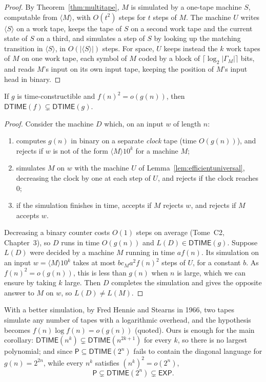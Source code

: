 \begin{proof}
By Theorem~\ref{thm:multitape}, $M$ is simulated by a one-tape machine $S$, computable from $\langle M\rangle$, with $O(t^2)$ steps for $t$ steps of $M$. The machine $U$ writes $\langle S\rangle$ on a work tape, keeps the tape of $S$ on a second work tape and the current state of $S$ on a third, and simulates a step of $S$ by looking up the matching transition in $\langle S\rangle$, in $O(|\langle S\rangle|)$ steps. For space, $U$ keeps instead the $k$ work tapes of $M$ on one work tape, each symbol of $M$ coded by a block of $\lceil\log_2|\Gamma_M|\rceil$ bits, and reads $M$'s input on its own input tape, keeping the position of $M$'s input head in binary.
\end{proof}

\begin{theorem}\label{thm:timehierarchy}
If $g$ is time-constructible and $f(n)^2=o(g(n))$, then $\mathsf{DTIME}(f)\subsetneq\mathsf{DTIME}(g)$.
\end{theorem}

\begin{proof}
Consider the machine $D$ which, on an input $w$ of length $n$:
\begin{enumerate}
\item computes $g(n)$ in binary on a separate \emph{clock} tape (time $O(g(n))$), and rejects if $w$ is not of the form $\langle M\rangle10^k$ for a machine $M$;
\item simulates $M$ on $w$ with the machine $U$ of Lemma~\ref{lem:efficientuniversal}, decreasing the clock by one at each step of $U$, and rejects if the clock reaches $0$;
\item if the simulation finishes in time, accepts if $M$ rejects $w$, and rejects if $M$ accepts $w$.
\end{enumerate}
Decreasing a binary counter costs $O(1)$ steps on average (Tome~C2, Chapter~3), so $D$ runs in time $O(g(n))$ and $L(D)\in\mathsf{DTIME}(g)$. Suppose $L(D)$ were decided by a machine $M$ running in time $af(n)$. Its simulation on an input $w=\langle M\rangle10^k$ takes at most $bc_Ma^2f(n)^2$ steps of $U$, for a constant $b$. As $f(n)^2=o(g(n))$, this is less than $g(n)$ when $n$ is large, which we can ensure by taking $k$ large. Then $D$ completes the simulation and gives the opposite answer to $M$ on $w$, so $L(D)\ne L(M)$.
\end{proof}

With a better simulation, by Fred Hennie and Stearns in 1966, two tapes simulate any number of tapes with a logarithmic overhead, and the hypothesis becomes $f(n)\log f(n)=o(g(n))$ (quoted). Ours is enough for the main corollary: $\mathsf{DTIME}(n^k)\subsetneq\mathsf{DTIME}(n^{2k+1})$ for every $k$, so there is no largest polynomial; and since $\mathsf P\subseteq\mathsf{DTIME}(2^n)$ fails to contain the diagonal language for $g(n)=2^{2n}$, while every $n^k$ satisfies $(n^k)^2=o(2^n)$,
\[
\mathsf P\subsetneq\mathsf{DTIME}(2^n)\subsetneq\mathsf{EXP}.
\]

